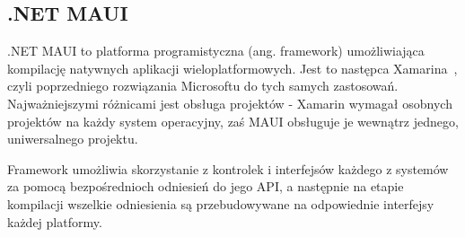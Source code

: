 \subsection{.NET MAUI}
.NET MAUI \cite{mauiDefinition} to platforma programistyczna (ang. framework) umożliwiająca
kompilację natywnych aplikacji wieloplatformowych. Jest to następca Xamarina~\cite{xamarin},
czyli poprzedniego rozwiązania Microsoftu do tych samych zastosowań. Najważniejszymi różnicami
jest obsługa projektów - Xamarin wymagał osobnych projektów na każdy system operacyjny, zaś MAUI
obsługuje je wewnątrz jednego, uniwersalnego projektu.

Framework umożliwia skorzystanie z kontrolek i interfejsów każdego z systemów za pomocą 
bezpośrednioch odniesień do jego API, a następnie na etapie kompilacji wszelkie odniesienia są
przebudowywane na odpowiednie interfejsy każdej platformy.